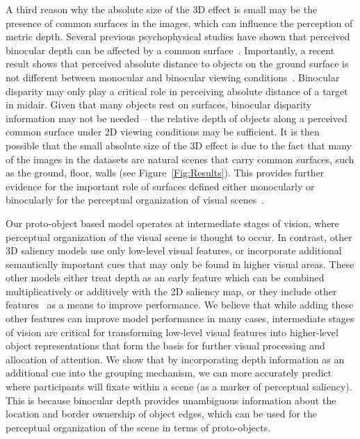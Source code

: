 A third reason why the absolute size of the 3D effect is small may be the presence of common surfaces in the images, which can influence the
perception of metric depth. Several previous psychophysical studies have shown that perceived binocular depth can be affected by a common
surface~\citep{McKee_83,Glennerster_McKee99,He_Ooi00}. Importantly, a recent result shows that perceived absolute distance to objects on the
ground surface is not different between monocular and binocular viewing conditions~\citep{Ooi_He15}. Binocular disparity may only play a critical role in perceiving absolute distance of a target in midair. Given that many objects rest on surfaces, binocular disparity information may not be needed -- the relative depth of objects along a perceived common surface under 2D viewing conditions may be sufficient. It is then possible that the small absolute size of the 3D effect is due to the fact that many of the images in the datasets are natural scenes that carry common surfaces, such as the ground, floor, walls \etc (see Figure~\ref{Fig:Results}). This provides further evidence for the important role of surfaces defined either monocularly or binocularly for the perceptual organization of visual scenes~\citep{He_Nakayama92,He_Nakayama95,Hu_etal15a}.

Our proto-object based model operates at intermediate stages of vision, where perceptual organization of the visual scene is thought to occur. In contrast, other 3D saliency models use only low-level visual features, or incorporate additional semantically important cues that may only be found in higher visual areas. These other models either treat depth as an early feature which can be combined multiplicatively or additively with the 2D saliency map, or they include other features~\citep[such as human face and body detection,][]{Cerf_etal08} as a means to improve performance. We believe that while adding these other features can improve model performance in many cases, intermediate stages of vision are critical for transforming low-level visual features into higher-level object representations that form the basis for further visual processing and allocation of attention. We show that by incorporating depth information as an additional cue into the grouping mechanism, we can more accurately predict where participants will fixate within a scene (\ie as a marker of perceptual saliency). This is because binocular depth provides unambiguous information about the location and border ownership of object edges, which can be used for the perceptual organization of the scene in terms of proto-objects.

